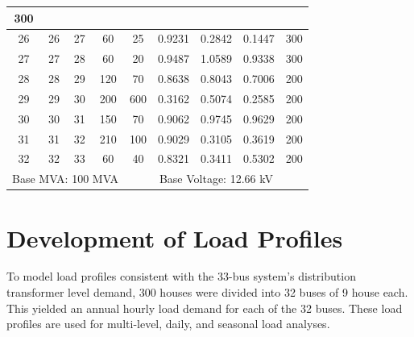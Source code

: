 \documentclass[12pt]{article}
\begin{document}
\begin{table}[htbp]
{\begin{tabular}{|ccccccccc|}
				300 \\ \hline
				\multicolumn{1}{|c|}{26} &
				\multicolumn{1}{c|}{26} &
				\multicolumn{1}{c|}{27} &
				\multicolumn{1}{c|}{60} &
				\multicolumn{1}{c|}{25} &
				\multicolumn{1}{c|}{0.9231} &
				\multicolumn{1}{c|}{0.2842} &
				\multicolumn{1}{c|}{0.1447} &
				300 \\ \hline
				\multicolumn{1}{|c|}{27} &
				\multicolumn{1}{c|}{27} &
				\multicolumn{1}{c|}{28} &
				\multicolumn{1}{c|}{60} &
				\multicolumn{1}{c|}{20} &
				\multicolumn{1}{c|}{0.9487} &
				\multicolumn{1}{c|}{1.0589} &
				\multicolumn{1}{c|}{0.9338} &
				300 \\ \hline
				\multicolumn{1}{|c|}{28} &
				\multicolumn{1}{c|}{28} &
				\multicolumn{1}{c|}{29} &
				\multicolumn{1}{c|}{120} &
				\multicolumn{1}{c|}{70} &
				\multicolumn{1}{c|}{0.8638} &
				\multicolumn{1}{c|}{0.8043} &
				\multicolumn{1}{c|}{0.7006} &
				200 \\ \hline
				\multicolumn{1}{|c|}{29} &
				\multicolumn{1}{c|}{29} &
				\multicolumn{1}{c|}{30} &
				\multicolumn{1}{c|}{200} &
				\multicolumn{1}{c|}{600} &
				\multicolumn{1}{c|}{0.3162} &
				\multicolumn{1}{c|}{0.5074} &
				\multicolumn{1}{c|}{0.2585} &
				200 \\ \hline
				\multicolumn{1}{|c|}{30} &
				\multicolumn{1}{c|}{30} &
				\multicolumn{1}{c|}{31} &
				\multicolumn{1}{c|}{150} &
				\multicolumn{1}{c|}{70} &
				\multicolumn{1}{c|}{0.9062} &
				\multicolumn{1}{c|}{0.9745} &
				\multicolumn{1}{c|}{0.9629} &
				200 \\ \hline
				\multicolumn{1}{|c|}{31} &
				\multicolumn{1}{c|}{31} &
				\multicolumn{1}{c|}{32} &
				\multicolumn{1}{c|}{210} &
				\multicolumn{1}{c|}{100} &
				\multicolumn{1}{c|}{0.9029} &
				\multicolumn{1}{c|}{0.3105} &
				\multicolumn{1}{c|}{0.3619} &
				200 \\ \hline
				\multicolumn{1}{|c|}{32} &
				\multicolumn{1}{c|}{32} &
				\multicolumn{1}{c|}{33} &
				\multicolumn{1}{c|}{60} &
				\multicolumn{1}{c|}{40} &
				\multicolumn{1}{c|}{0.8321} &
				\multicolumn{1}{c|}{0.3411} &
				\multicolumn{1}{c|}{0.5302} &
				200 \\ \hline
				\multicolumn{4}{|c|}{Base MVA: 100 MVA} &
				\multicolumn{5}{c|}{Base Voltage: 12.66 kV} \\ \hline
			\end{tabular}%
		}
	\end{table}
	
	\section{Development of Load Profiles}
	To model load profiles consistent with the 33-bus system’s distribution transformer level demand, 300 houses were divided into 32 buses of 9 house each. This yielded an annual hourly load demand for each of the 32 buses. These load profiles are used for multi-level, daily, and seasonal load analyses.
	
\end{document}
